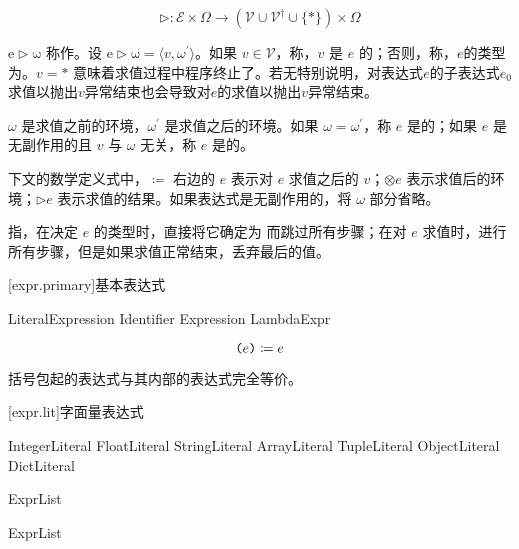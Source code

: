 $$ \mathrm{\rhd}: \mathcal{E} \times \Omega \rightarrow (\mathcal{V} \cup \mathcal{V}^\dag \cup \{\ast\}) \times \Omega $$

\pnum
$\mathrm{e \rhd \omega}$ 称作。设 $\mathrm{e \rhd \omega} = \langle v, \omega^\prime \rangle$。如果 $v \in \mathcal{V}$，称，$v$ 是 $e$ 的；否则，称，$e$的类型为。$v = \ast$ 意味着求值过程中程序终止了。若无特别说明，对表达式$e$的子表达式$e_0$求值以抛出$v$异常结束也会导致对$e$的求值以抛出$v$异常结束。

\pnum
$\omega$ 是求值之前的环境，$\omega^\prime$ 是求值之后的环境。如果 $\omega = \omega^\prime$，称 $e$ 是的；如果 $e$ 是无副作用的且 $v$ 与 $\omega$ 无关，称 $e$ 是的。

\pnum
下文的数学定义式中，$\coloneqq$ 右边的 $e$ 表示对 $e$ 求值之后的 $v$；$\otimes e$ 表示求值后的环境；$\rhd e$ 表示求值的结果。如果表达式是无副作用的，将 $\omega$ 部分省略。

\pnum
{}指，在决定 $e$ 的类型时，直接将它确定为  而跳过所有步骤；在对 $e$ 求值时，进行所有步骤，但是如果求值正常结束，丢弃最后的值。

[expr.primary]{基本表达式}

\begin{bnf}
 \br
    LiteralExpression \br
    Identifier \br
    \terminal{(} Expression \terminal{)} \br
    LambdaExpr
\end{bnf}

$$ \texttt{(}e\texttt{)} \coloneqq e $$

\pnum
括号包起的表达式与其内部的表达式完全等价。

[expr.lit]{字面量表达式}

\begin{bnf}
 \br
    IntegerLiteral \br
    FloatLiteral \br
    StringLiteral \br
     \br
     \br
     \br
    \terminal{()} \br
    ArrayLiteral \br
    TupleLiteral \br
    ObjectLiteral \br
    DictLiteral \br
\end{bnf}

\begin{bnf}
 \br
    \terminal{[} ExprList\bnfq \terminal{]}
\end{bnf}

\begin{bnf}
 \br
    \terminal{(} ExprList\bnfq \terminal{)}
\end{bnf}

